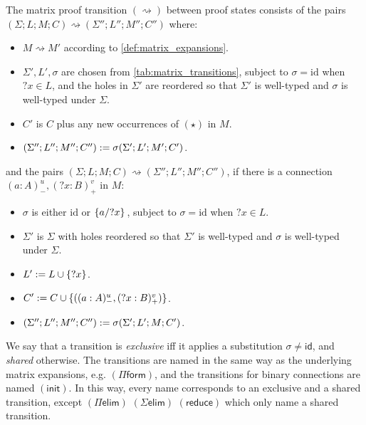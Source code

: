 \documentclass[twoside]{report}
\begin{document}
\begin{definition}
    \label{def:matrix_transitions}
    The matrix proof transition $(\rightsquigarrow)$ between proof states consists of the pairs $(\Sigma; L; M; C) \rightsquigarrow (\Sigma''; L''; M''; C'')$ where:
    \begin{itemize}[noitemsep]
        \item $M \rightsquigarrow M'$ according to \cref{def:matrix_expansions}.
        \item $\Sigma', L', \sigma$ are chosen from \cref{tab:matrix_transitions}, subject to $\sigma = \mathrm{id}$ when ${?x} \in L$, and the holes in $\Sigma'$ are reordered so that $\Sigma'$ is well-typed and $\sigma$ is well-typed under $\Sigma$.
        \item $C'$ is $C$ plus any new occurrences of $(\star)$ in $M$.
        \item $(\Sigma''; L''; M''; C'') \defeq \sigma (\Sigma'; L'; M'; C')$.
    \end{itemize}
    and the pairs $(\Sigma; L; M; C) \rightsquigarrow (\Sigma''; L''; M''; C'')$, if there is a connection $(a : A)^u_-, ({?x} : B)^v_+$ in $M$:
    \begin{itemize}[noitemsep]
        \item $\sigma$ is either $\mathrm{id}$ or $\subst {?x} {a} {}$, subject to $\sigma = \mathrm{id}$ when ${?x} \in L$.
        \item $\Sigma'$ is $\Sigma$ with holes reordered so that $\Sigma'$ is well-typed and $\sigma$ is well-typed under $\Sigma$.
        \item $L' \defeq L \cup \{?x\}$.
        \item $C' \defeq C \cup \{((a : A)^u_-, ({?x} : B)^v_+)\}$.
        \item $(\Sigma''; L''; M''; C'') \defeq \sigma (\Sigma'; L'; M; C')$.
    \end{itemize}
    We say that a transition is \emph{exclusive} iff it applies a substitution $\sigma \neq \mathsf{id}$, and \emph{shared} otherwise. The transitions are named in the same way as the underlying matrix expansions, e.g. $(\Pi\mathsf{form})$, and the transitions for binary connections are named $(\mathsf{init})$. In this way, every name corresponds to an exclusive and a shared transition, except $(\Pi\mathsf{elim})$ $(\Sigma\mathsf{elim})$ $(\mathsf{reduce})$ which only name a shared transition.
\end{definition}
\end{document}

